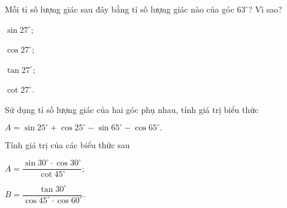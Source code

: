 \begin{bt}
	Mỗi tỉ số lượng giác sau đây bằng tỉ số lượng giác nào của góc $63^\circ$? Vì sao?
	\begin{enumEX}{4}
	\item $\sin27^\circ$;
	\item $\cos27^\circ$;
	\item $\tan27^\circ$;
	\item $\cot27^\circ$.
	\end{enumEX}
\end{bt}
\begin{bt}
	Sử dụng tỉ số lượng giác của hai góc phụ nhau, tính giá trị biểu thức 
	\begin{center}
	$A=\sin25^\circ+\cos25^\circ-\sin65^\circ-\cos65^\circ.$
	\end{center}
\end{bt}
\begin{bt}
	Tính giá trị của các biểu thức sau
	\begin{enumEX}{2}
	\item $A=\dfrac{\sin 30^\circ\cdot\cos 30^\circ}{\cot 45^\circ}$;
	\item $B=\dfrac{\tan 30^\circ}{\cos 45^\circ\cdot\cos 60^\circ}$.
	\end{enumEX}
\end{bt}
